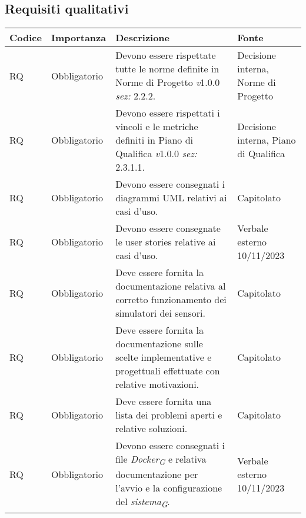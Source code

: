 \subsection{Requisiti qualitativi}
\setcounter{rowcounter}{0}
\begin{longtable}{|C{1.5cm}|C{2cm}|L{5cm}|C{2cm}|}
    \hline
    \textbf{Codice} & \textbf{Importanza} & \textbf{Descrizione} & \textbf{Fonte} \\

    \hline
     RQ & Obbligatorio & Devono essere rispettate tutte le norme definite in Norme di Progetto \textit{v}1.0.0 \textit{sez:} 2.2.2. & Decisione interna, Norme di Progetto\\

    \hline
     RQ & Obbligatorio & Devono essere rispettati i vincoli e le metriche definiti in Piano di Qualifica \textit{v}1.0.0 \textit{sez:} 2.3.1.1. & Decisione interna, Piano di Qualifica \\

    \hline
     RQ & Obbligatorio & Devono essere consegnati i diagrammi UML relativi ai casi d'uso. & Capitolato \\

    \hline
     RQ & Obbligatorio & Devono essere consegnate le user stories relative ai casi d'uso. & Verbale esterno 10/11/2023 \\

    \hline
     RQ & Obbligatorio & Deve essere fornita la documentazione relativa al corretto funzionamento dei simulatori dei sensori. & Capitolato \\

    \hline
     RQ & Obbligatorio & Deve essere fornita la documentazione sulle scelte implementative e progettuali effettuate con relative motivazioni. & Capitolato \\

    \hline
     RQ & Obbligatorio & Deve essere fornita una lista dei problemi aperti e relative soluzioni. & Capitolato \\

    \hline
     RQ & Obbligatorio & Devono essere consegnati i file \textit{Docker}\textsubscript{\textit{G}} e relativa documentazione per l'avvio e la configurazione del \textit{sistema}\textsubscript{\textit{G}}. & Verbale esterno 10/11/2023 \\


\end{longtable}
